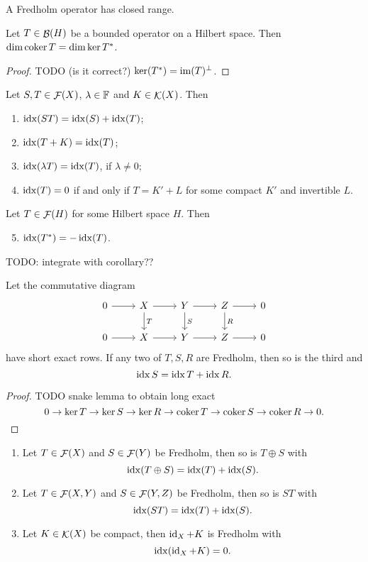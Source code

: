 \begin{lemma}
A Fredholm operator has closed range.
\end{lemma}

\begin{lemma}
Let $T\in\mathop{\mathcal{B}}(H)$ be a bounded operator on a Hilbert space. Then $\dim\operatorname{coker} T = \dim\ker T^*$.
\end{lemma}
\begin{proof}
TODO (is it correct?) $\ker(T^*) = \operatorname{im}(T)^\perp$.
\end{proof}


\begin{proposition}
Let $S,T\in\mathop{\mathcal{F}}(X)$, $\lambda\in\mathbb{F}$ and $K\in\mathop{\mathcal{K}}(X)$. Then
\begin{enumerate}
\item $\operatorname{idx}(ST) = \operatorname{idx}(S)+\operatorname{idx}(T)$;
\item $\operatorname{idx}(T+K) = \operatorname{idx}(T)$;
\item $\operatorname{idx}(\lambda T) = \operatorname{idx}(T)$, if $\lambda \neq 0$;
\item $\operatorname{idx}(T) = 0$ \textup{if and only if} $T=K'+L$ for some compact $K'$ and invertible $L$.
\end{enumerate}
Let $T\in\mathop{\mathcal{F}}(H)$ for some Hilbert space $H$. Then
\begin{enumerate} \setcounter{enumi}{4}
\item $\operatorname{idx}(T^*) = -\operatorname{idx}(T)$.
\end{enumerate}
\end{proposition}
TODO: integrate with corollary??

\begin{lemma}
Let the commutative diagram
\[ \begin{tikzcd}
0 \rar & X \dar{T} \rar & Y \dar{S} \rar & Z \dar{R} \rar & 0 \\
0 \rar & X \rar & Y \rar & Z \rar & 0
\end{tikzcd} \]
have short exact rows. If any two of $T,S,R$ are Fredholm, then so is the third and
\[ \operatorname{idx} S = \operatorname{idx} T + \operatorname{idx} R. \]
\end{lemma}
\begin{proof}
TODO snake lemma to obtain long exact
\[ 0\to \ker T \to \ker S\to \ker R \to \operatorname{coker} T \to \operatorname{coker} S \to \operatorname{coker} R \to 0. \]
\end{proof}
\begin{corollary} \mbox{}
\begin{enumerate} 
\item Let $T\in\mathop{\mathcal{F}}(X)$ and $S\in\mathop{\mathcal{F}}(Y)$ be Fredholm, then so is $T\oplus S$ with
\[ \operatorname{idx}(T\oplus S) = \operatorname{idx}(T)+\operatorname{idx}(S). \]
\item Let $T\in\mathop{\mathcal{F}}(X,Y)$ and $S\in\mathop{\mathcal{F}}(Y,Z)$ be Fredholm, then so is $ST$ with
\[ \operatorname{idx}(ST) = \operatorname{idx}(T)+\operatorname{idx}(S). \]
\item Let $K\in\mathop{\mathcal{K}}(X)$ be compact, then $\operatorname{id}_X+K$ is Fredholm with
\[ \operatorname{idx}(\operatorname{id}_X+K) = 0. \]
\end{enumerate}
\end{corollary}


